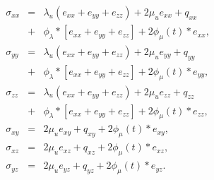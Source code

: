 \documentclass[11pt]{article}
\begin{document}
%
\begin{eqnarray*}
  \sigma_{xx} & = & \lambda_u \left (e_{xx} + e_{yy} + e_{zz}\right)
                                   + 2\mu_u e_{xx} +q_{xx}          \\  
              & + & \phi_{\lambda}*[e_{xx}+e_{yy}+e_{zz}] 
                                    + 2\phi_{\mu}(t)*e_{xx},        \\
  \sigma_{yy} & = & \lambda_u \left (e_{xx} + e_{yy} + e_{zz}\right)
                                    + 2\mu_u e_{yy} +q_{yy}         \\ 
              & + & \phi_{\lambda}*[e_{xx}+e_{yy}+e_{zz}] 
                                    + 2\phi_{\mu}(t)*e_{yy},        \\
  \sigma_{zz} & = & \lambda_u \left (e_{xx} + e_{yy} + e_{zz}\right)
                                    + 2\mu_u e_{zz} +q_{zz}         \\ 
              & + & \phi_{\lambda}*[e_{xx}+e_{yy}+e_{zz}] 
                                    + 2\phi_{\mu}(t)*e_{zz},        \\
  \sigma_{xy} & = & 2\mu_u e_{xy} +q_{xy} + 2\phi_{\mu}(t)*e_{xy},  \\
  \sigma_{xz} & = & 2\mu_u e_{xz} +q_{xz} + 2\phi_{\mu}(t)*e_{xz},  \\
  \sigma_{yz} & = & 2\mu_u e_{yz} +q_{yz}+  2\phi_{\mu}(t)*e_{yz}.
\end{eqnarray*}
%
\end{document}
